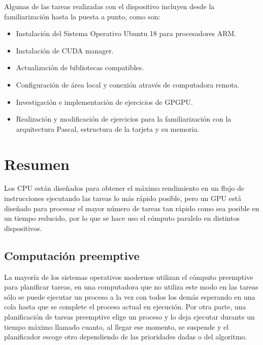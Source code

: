    Algunas de las tareas realizadas con el dispositivo incluyen desde la familiarización hasta la puesta a punto, como son:
   \begin{itemize}
    \item Instalación del Sistema Operativo Ubuntu 18 para procesadores ARM.
     \item Instalación de CUDA manager.
     \item Actualización de bibliotecas compatibles.
     \item Configuración de área local y conexión através de computadora remota.
      \item Investigación e implementación de ejercicios de \acrshort{GPGPU}.
       \item Realización y modificación de ejercicios para la familiarización con la arquitectura Pascal, estructura de la tarjeta y su memoria.
    \end{itemize}   
   
    \section{Resumen}

Los \acrshort{CPU} están diseñados para obtener el máximo rendimiento en un flujo de instrucciones ejecutando las tareas lo más rápido posible, pero un \acrshort{GPU} está diseñado para procesar el mayor número de tareas tan rápido como sea posible en un tiempo reducido, por lo que se hace uso el cómputo paralelo en distintos dispositivos.

\subsection{Computación \gls{preemptive}}
	La mayoría de los sistemas operativos modernos utilizan el cómputo preemptive para planificar tareas, en una computadora que no utiliza este modo en las tareas sólo se puede ejecutar un proceso a la vez con todos los demás esperando en una cola hasta que se complete el proceso actual en ejecución. Por otra parte, una planificación de tareas \gls{preemptive} elige un proceso y lo deja ejecutar durante un tiempo máximo llamado cuanto\cite{PreeK}, al llegar ese momento, se suspende y el planificador escoge otro dependiendo de las prioridades dadas o del algoritmo.


